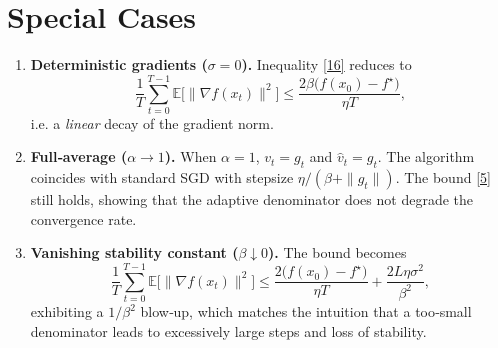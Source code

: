 \documentclass{article}
\newcommand{\EE}{\mathbb{E}}
\newcommand{\grad}{\nabla}
\begin{document}
\section*{Special Cases}
\begin{enumerate}
\item \textbf{Deterministic gradients ($\sigma=0$).}  
Inequality \eqref{16} reduces to
\[
\frac{1}{T}\sum_{t=0}^{T-1}\EE\!\big[\|\grad f(x_t)\|^{2}\big]
\le\frac{2\beta\big(f(x_0)-f^{\star}\big)}{\eta T},
\]
i.e. a \emph{linear} decay of the gradient norm.
\item \textbf{Full‑average ($\alpha\to1$).}  
When $\alpha=1$, $v_t=g_t$ and $\hat v_t=g_t$.  The algorithm coincides with
standard SGD with stepsize $\eta/(\beta+\|g_t\|)$.  The bound \eqref{5} still holds, showing that the adaptive denominator does not degrade the convergence rate.
\item \textbf{Vanishing stability constant ($\beta\downarrow 0$).}  
The bound becomes
\[
\frac{1}{T}\sum_{t=0}^{T-1}\EE\!\big[\|\grad f(x_t)\|^{2}\big]
\le
\frac{2\big(f(x_0)-f^{\star}\big)}{\eta T}
+\frac{2L\eta\sigma^{2}}{\beta^{2}},
\]
exhibiting a $1/\beta^{2}$ blow‑up, which matches the intuition that a too‑small denominator leads to excessively large steps and loss of stability.
\end{enumerate}
\end{document}
